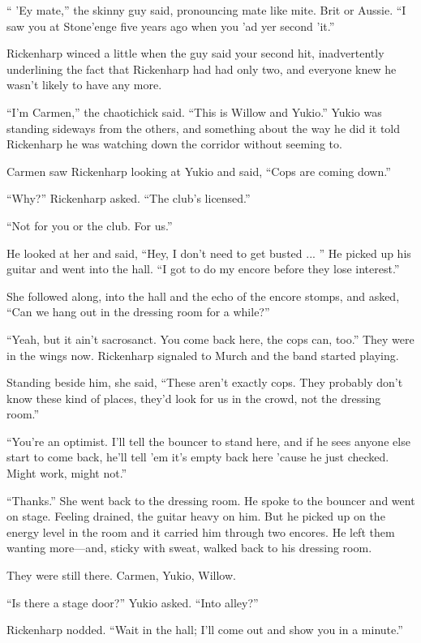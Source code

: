 `` 'Ey mate,'' the skinny guy said, pronouncing mate like mite. Brit or Aussie. ``I saw you at Stone'enge five years ago when you 'ad yer second 'it.''

Rickenharp winced a little when the guy said your second hit, inadvertently underlining the fact that Rickenharp had had only two, and everyone knew he wasn't likely to have any more.

``I'm Carmen,'' the chaotichick said. ``This is Willow and Yukio.'' Yukio was standing sideways from the others, and something about the way he did it told Rickenharp he was watching down the corridor without seeming to.

Carmen saw Rickenharp looking at Yukio and said, ``Cops are coming down.''

``Why?'' Rickenharp asked. ``The club's licensed.''

``Not for you or the club. For us.''

He looked at her and said, ``Hey, I don't need to get busted ... '' He picked up his guitar and went into the hall. ``I got to do my encore before they lose interest.''

She followed along, into the hall and the echo of the encore stomps, and asked, ``Can we hang out in the dressing room for a while?''

``Yeah, but it ain't sacrosanct. You come back here, the cops can, too.'' They were in the wings now. Rickenharp signaled to Murch and the band started playing.

Standing beside him, she said, ``These aren't exactly cops. They probably don't know these kind of places, they'd look for us in the crowd, not the dressing room.''

``You're an optimist. I'll tell the bouncer to stand here, and if he sees anyone else start to come back, he'll tell 'em it's empty back here 'cause he just checked. Might work, might not.''

``Thanks.'' She went back to the dressing room. He spoke to the bouncer and went on stage. Feeling drained, the guitar heavy on him. But he picked up on the energy level in the room and it carried him through two encores. He left them wanting more—and, sticky with sweat, walked back to his dressing room.

They were still there. Carmen, Yukio, Willow.

``Is there a stage door?'' Yukio asked. ``Into alley?''

Rickenharp nodded. ``Wait in the hall; I'll come out and show you in a minute.''

